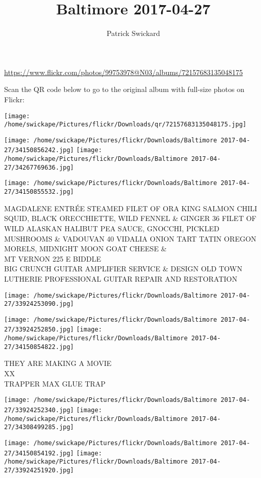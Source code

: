 \documentclass[10pt,letterpaper]{article}
\title{Baltimore 2017-04-27}
\author{Patrick Swickard}
\date{}
\begin{document}
\maketitle

\url{https://www.flickr.com/photos/99753978@N03/albums/72157683135048175}

Scan the QR code below to go to the original album with full-size photos on Flickr:

\texttt{[image: /home/swickape/Pictures/flickr/Downloads/qr/72157683135048175.jpg]}
\pagebreak

\texttt{[image: /home/swickape/Pictures/flickr/Downloads/Baltimore 2017-04-27/34150856242.jpg]}
\texttt{[image: /home/swickape/Pictures/flickr/Downloads/Baltimore 2017-04-27/34267769636.jpg]}

\texttt{[image: /home/swickape/Pictures/flickr/Downloads/Baltimore 2017-04-27/34150855532.jpg]}

MAGDALENE ENTRÉE STEAMED FILET OF ORA KING SALMON CHILI SQUID, BLACK ORECCHIETTE, WILD FENNEL \& GINGER 36 FILET OF WILD ALASKAN HALIBUT PEA SAUCE, GNOCCHI, PICKLED MUSHROOMS \& VADOUVAN 40 VIDALIA ONION TART TATIN OREGON MORELS, MIDNIGHT MOON GOAT CHEESE \&\\
MT VERNON 225 E BIDDLE\\
BIG CRUNCH GUITAR AMPLIFIER SERVICE \& DESIGN OLD TOWN LUTHERIE PROFESSIONAL GUITAR REPAIR AND RESTORATION
\pagebreak

\texttt{[image: /home/swickape/Pictures/flickr/Downloads/Baltimore 2017-04-27/33924253090.jpg]}

\vspace{0.25in}
\texttt{[image: /home/swickape/Pictures/flickr/Downloads/Baltimore 2017-04-27/33924252850.jpg]}
\texttt{[image: /home/swickape/Pictures/flickr/Downloads/Baltimore 2017-04-27/34150854822.jpg]}

THEY ARE MAKING A MOVIE\\
XX\\
TRAPPER MAX GLUE TRAP
\pagebreak

\texttt{[image: /home/swickape/Pictures/flickr/Downloads/Baltimore 2017-04-27/33924252340.jpg]}
\texttt{[image: /home/swickape/Pictures/flickr/Downloads/Baltimore 2017-04-27/34308499285.jpg]}

\texttt{[image: /home/swickape/Pictures/flickr/Downloads/Baltimore 2017-04-27/34150854192.jpg]}
\texttt{[image: /home/swickape/Pictures/flickr/Downloads/Baltimore 2017-04-27/33924251920.jpg]}
\end{document}
